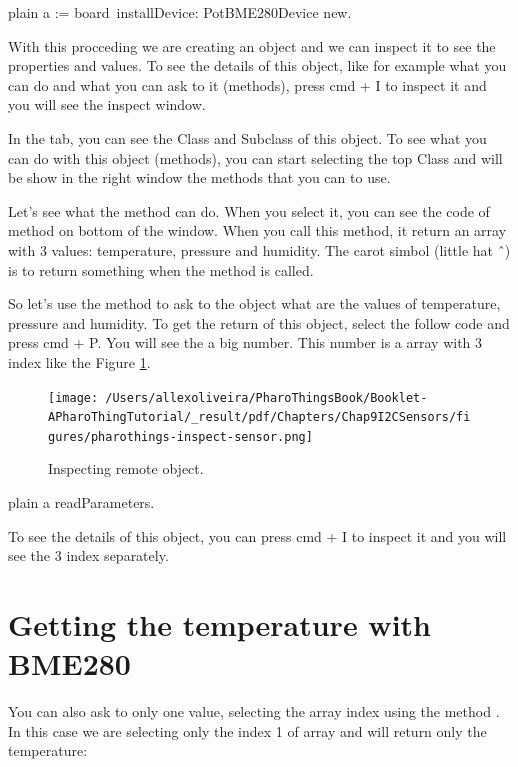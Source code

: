 \documentclass[10pt,twoside,english]{_support/latex/sbabook/sbabook}
\begin{document}
\begin{displaycode}{plain}
a := board installDevice: PotBME280Device new. ​
\end{displaycode}

With this procceding we are creating an object and we can inspect it to see the properties and values. To see the details of this object, like for example what you can do and what you can ask to it (methods), press cmd + I to inspect it and you will see the inspect window. 

In the  tab, you can see the Class and Subclass of this object. To see what you can do with this object (methods), you can start selecting the top Class and will be show in the right window the methods that you can to use.

Let's see what the method  can do. When you select it, you can see the code of method on bottom of the window. When you call this method, it return an array with 3 values: temperature, pressure and humidity. The carot simbol (little hat ˆ) is to return something when the method is called. 

So let's use the method  to ask to the object what are the values of temperature, pressure and humidity. To get the return of this object, select the follow code and press cmd + P. You will see the a big number. This number is a array with 3 index like the Figure \ref{inspectorSensor}. 


\begin{figure}

\begin{center}
\texttt{[image: /Users/allexoliveira/PharoThingsBook/Booklet-APharoThingTutorial/\_result/pdf/Chapters/Chap9I2CSensors/figures/pharothings-inspect-sensor.png]}\caption{Inspecting remote object.\label{inspectorSensor}}\end{center}
\end{figure}


\begin{displaycode}{plain}
a readParameters.
\end{displaycode}

To see the details of this object, you can press cmd + I to inspect it and you will see the 3 index separately. 
\section{Getting the temperature with BME280}
You can also ask to only one value, selecting the array index using the method . In this case we are selecting only the index 1 of array and will return only the temperature:
\end{document}
